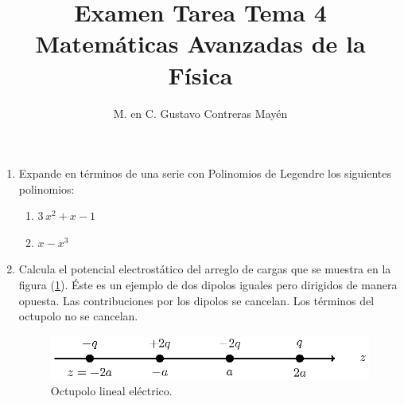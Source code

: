 
\geometry{top=1.25cm, bottom=1.5cm, left=1.25cm, right=0.8cm}
\title{Examen Tarea Tema 4 \\ \large {Matemáticas Avanzadas de la Física}  \vspace{-3ex}}
\author{M. en C. Gustavo Contreras Mayén}
\date{ }

\vspace{-4cm}
\maketitle
\fontsize{14}{14}\selectfont
\begin{enumerate}
\item Expande en términos de una serie con Polinomios de Legendre los siguientes polinomios:
\begin{enumerate}
\item $3 \, x^{2} + x - 1$
\item $x - x^{3}$
\end{enumerate}
\item Calcula el potencial electrostático del arreglo de cargas que se muestra en la figura (\ref{fig:figura_octupolo}). Éste es un ejemplo de dos dipolos iguales pero dirigidos de manera opuesta. Las contribuciones por los dipolos se cancelan. Los términos del octupolo no se cancelan.

\begin{figure}[H]
    \centering
    \includegraphics[scale=1.3]{Imagenes/octupolo_1.eps}
    \caption{Octupolo lineal eléctrico.}
    \label{fig:figura_octupolo}
\end{figure}


\end{enumerate}
